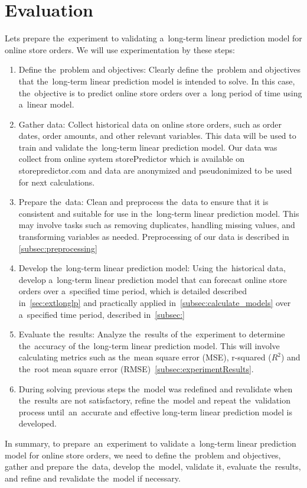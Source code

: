 
\chapter{Evaluation} \label{evaluation}
Lets prepare the~experiment to validating a~long-term linear prediction model for online store orders.
We will use experimentation by these steps:\\
\begin{enumerate}
    \item Define the~problem and objectives: Clearly define the~problem and objectives that the~long-term linear
    prediction model is intended to solve. In this case, the~objective is to predict online store orders over a~long
    period of time using a~linear model.
    \item Gather data: Collect historical data on online store orders, such as order dates, order amounts, and other
    relevant variables. This data will be used to train and validate the~long-term linear prediction model.
    Our data was collect from online system storePredictor which is available on storepredictor.com and data are
    anonymized and pseudonimized to be used for next calculations.
    \item Prepare the~data: Clean and preprocess the~data to ensure that it is consistent and suitable for
    use in the~long-term linear prediction model. This may involve tasks such as removing duplicates, handling missing
    values, and transforming variables as needed. Preprocessing of our data is described in \ref{subsec:preprocessing}
    \item Develop the~long-term linear prediction model: Using the~historical data, develop a~long-term linear
    prediction model that can forecast online store orders over a~specified time period, which is detailed
    described in~\ref{sec:extlonglp} and practically applied in~\ref{subsec:calculate_models}
    over a~specified time period, described in~\ref{subsec:}
    \item Evaluate the~results: Analyze the~results of the~experiment to determine the~accuracy of the~long-term
    linear prediction model. This will involve calculating metrics such as the~mean square error (MSE),
    r-squared ($R^2$) and the~root mean square error (RMSE)~\ref{subsec:experimentResults}.
    \item During solving previous steps the~model was redefined and revalidate when the~results are not satisfactory,
    refine the~model and repeat the~validation process until~an~accurate and effective long-term linear prediction
    model is developed.
\end{enumerate}
In summary, to prepare~an~experiment to validate a~long-term linear prediction model for online store orders, we need to
define the~problem and objectives, gather and prepare the~data, develop the~model, validate it, evaluate the~results,
and refine and revalidate the~model if necessary.
